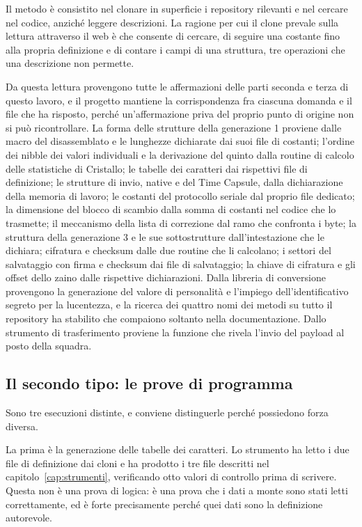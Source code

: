 Il metodo è consistito nel clonare in superficie i repository rilevanti e nel cercare nel codice, anziché leggere descrizioni. La ragione per cui il clone prevale sulla lettura attraverso il web è che consente di cercare, di seguire una costante fino alla propria definizione e di contare i campi di una struttura, tre operazioni che una descrizione non permette.

Da questa lettura provengono tutte le affermazioni delle parti seconda e terza di questo lavoro, e il progetto mantiene la corrispondenza fra ciascuna domanda e il file che ha risposto, perché un'affermazione priva del proprio punto di origine non si può ricontrollare. La forma delle strutture della generazione 1 proviene dalle macro del disassemblato e le lunghezze dichiarate dai suoi file di costanti; l'ordine dei nibble dei valori individuali e la derivazione del quinto dalla routine di calcolo delle statistiche di Cristallo; le tabelle dei caratteri dai rispettivi file di definizione; le strutture di invio, native e del Time Capsule, dalla dichiarazione della memoria di lavoro; le costanti del protocollo seriale dal proprio file dedicato; la dimensione del blocco di scambio dalla somma di costanti nel codice che lo trasmette; il meccanismo della lista di correzione dal ramo che confronta i byte; la struttura della generazione 3 e le sue sottostrutture dall'intestazione che le dichiara; cifratura e checksum dalle due routine che li calcolano; i settori del salvataggio con firma e checksum dai file di salvataggio; la chiave di cifratura e gli offset dello zaino dalle rispettive dichiarazioni. Dalla libreria di conversione provengono la generazione del valore di personalità e l'impiego dell'identificativo segreto per la lucentezza, e la ricerca dei quattro nomi dei metodi su tutto il repository ha stabilito che compaiono soltanto nella documentazione. Dallo strumento di trasferimento proviene la funzione che rivela l'invio del payload al posto della squadra.

\subsection{Il secondo tipo: le prove di programma}

Sono tre esecuzioni distinte, e conviene distinguerle perché possiedono forza diversa.

La prima è la generazione delle tabelle dei caratteri. Lo strumento ha letto i due file di definizione dai cloni e ha prodotto i tre file descritti nel capitolo~\ref{cap:strumenti}, verificando otto valori di controllo prima di scrivere. Questa non è una prova di logica: è una prova che i dati a monte sono stati letti correttamente, ed è forte precisamente perché quei dati sono la definizione autorevole.

